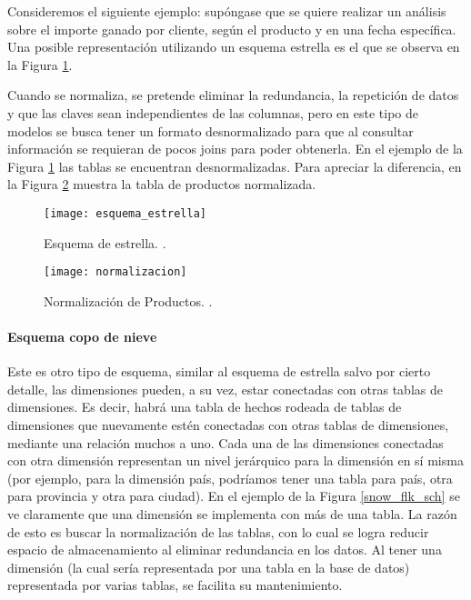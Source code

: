 \documentclass[a4paper,11pt]{article}
\begin{document}
    Consideremos el siguiente ejemplo: supóngase que se quiere realizar un análisis sobre el importe ganado por cliente, según el producto y en una fecha
    específica. Una posible representación utilizando un esquema estrella es el que se observa en la Figura \ref{star_sch}.
    
    Cuando se normaliza, se pretende eliminar la redundancia, la repetición de datos y que las claves sean independientes de
    las columnas, pero en este tipo de modelos se busca tener un formato desnormalizado para que al consultar información se requieran de pocos joins para
    poder obtenerla. En el ejemplo de la Figura \ref{star_sch} las tablas se encuentran desnormalizadas. Para apreciar la
    diferencia, en la Figura \ref{normalizado} muestra la tabla de productos normalizada.
    
    \begin{figure}
      \begin{center}
        \texttt{[image: esquema\_estrella]}
        \caption{Esquema de estrella. \cite[p.~38]{hefestov2}.}
        \label{star_sch}
      \end{center}
    \end{figure}
    
    \begin{figure}
      \begin{center}
        \texttt{[image: normalizacion]}
        \caption{Normalización de Productos. \cite[p.~38]{hefestov2}.}
        \label{normalizado}
      \end{center}
    \end{figure}
    
    
    \paragraph{Esquema copo de nieve}
    
    Este es otro tipo de esquema, similar al esquema de estrella salvo por cierto detalle, las dimensiones pueden, a su vez, estar conectadas con otras 
    tablas de dimensiones. Es decir, habrá una tabla de hechos rodeada de tablas de dimensiones que nuevamente estén conectadas con otras tablas de 
    dimensiones, mediante una relación muchos a uno. Cada una de las dimensiones conectadas con otra dimensión representan un nivel jerárquico para la dimensión en 
    sí misma (por ejemplo, para la dimensión país, podríamos tener una tabla para país, otra para provincia y otra para ciudad). En el ejemplo de la Figura 
    \ref{snow_flk_sch} se ve claramente que una dimensión se implementa con más de una tabla. La razón de esto es buscar la normalización de las tablas, con 
    lo cual se logra reducir espacio de almacenamiento al eliminar redundancia en los datos. Al tener una dimensión (la cual sería representada por una tabla 
    en la base de datos) representada por varias tablas, se facilita su mantenimiento.
    
\end{document}
